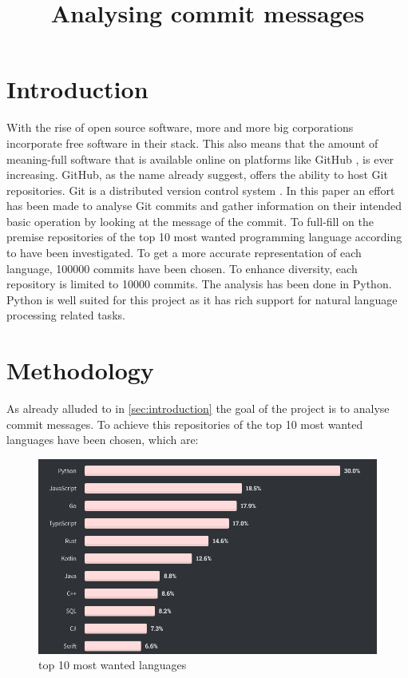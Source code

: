 \documentclass{article}
\title{Analysing commit messages}
\begin{document}
  \maketitle

  \section{Introduction}
  \label{sec:introduction}

  With the rise of open source software, more and more big corporations
  incorporate free software in their stack. This also means that the amount of
  meaning-full software that is available online on platforms like GitHub
  \cite{github}, is ever increasing. GitHub, as the name already suggest,
  offers the ability to host Git repositories. Git is a distributed version
  control system \cite{git}. In this paper an effort has been made to analyse
  Git commits and gather information on their intended basic operation by
  looking at the message of the commit. To full-fill on the premise
  repositories of the top 10 most wanted programming language according to
  \cite{so-survey} have been investigated. To get a more accurate
  representation of each language, 100000 commits have been chosen. To enhance
  diversity, each repository is limited to 10000 commits. The analysis has been
  done in Python. Python is well suited for this project as it has rich support
  for natural language processing related tasks.

  \section{Methodology}
  As already alluded to in \autoref{sec:introduction} the goal of the project is to
  analyse commit messages. To achieve this repositories of the top 10 most
  wanted languages have been chosen, which are:


  \begin{figure}[H]
    \centering
    \includegraphics[width=\textwidth]{wanted_languages.png}
    \caption{top 10 most wanted languages}
    \label{fig:wanted_languages}
  \end{figure}
\end{document}
